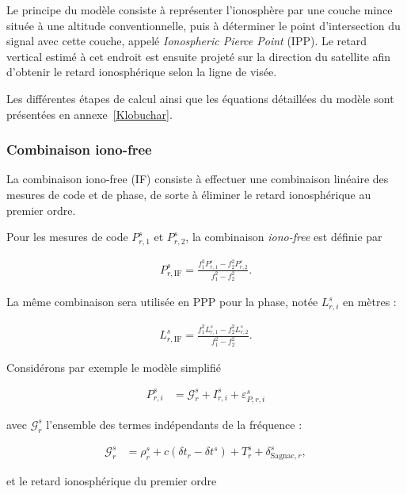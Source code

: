 Le principe du modèle consiste à représenter l'ionosphère par une couche
mince située à une altitude conventionnelle, puis à déterminer le point
d'intersection du signal avec cette couche, appelé \textit{Ionospheric
Pierce Point} (IPP). Le retard vertical estimé à cet endroit est ensuite
projeté sur la direction du satellite afin d'obtenir le retard
ionosphérique selon la ligne de visée.

Les différentes étapes de calcul ainsi que les équations détaillées du
modèle sont présentées en annexe~\ref{Klobuchar}.

\subsubsection{Combinaison iono-free}

La combinaison iono-free (IF) consiste à effectuer une combinaison linéaire des mesures de code et de phase, de
sorte à éliminer le retard
ionosphérique au premier ordre.

Pour les mesures de code $P_{r,1}^s$ et $P_{r,2}^s$, la combinaison
\textit{iono-free} est définie par

\begin{align}
P_{r,\mathrm{IF}}^s
=
\frac{
f_1^2P_{r,1}^s-f_2^2P_{r,2}^s
}{
f_1^2-f_2^2
}.
\label{eq:code_iono_free}
\end{align}

La même combinaison sera utilisée en PPP pour la phase,
notée $L_{r,i}^s$ en mètres :

\begin{align}
L_{r,\mathrm{IF}}^s
=
\frac{
f_1^2L_{r,1}^s-f_2^2L_{r,2}^s
}{
f_1^2-f_2^2
}.
\label{eq:phase_iono_free}
\end{align}

Considérons par exemple le modèle simplifié

\begin{align}
P_{r,i}^s
&=
\mathcal G_r^s
+
I_{r,i}^s
+
\varepsilon_{P,r,i}^s
\end{align}

avec $\mathcal G_r^s$ l'ensemble des termes indépendants de la fréquence :

\begin{align}
\mathcal G_r^s
&=
\rho_r^s
+c\left(\delta t_r-\delta t^s\right)
+T_r^s
+\delta_{\mathrm{Sagnac},r}^s
,
\label{eq:common_nondispersive_term}
\end{align}

et le retard ionosphérique du premier ordre

